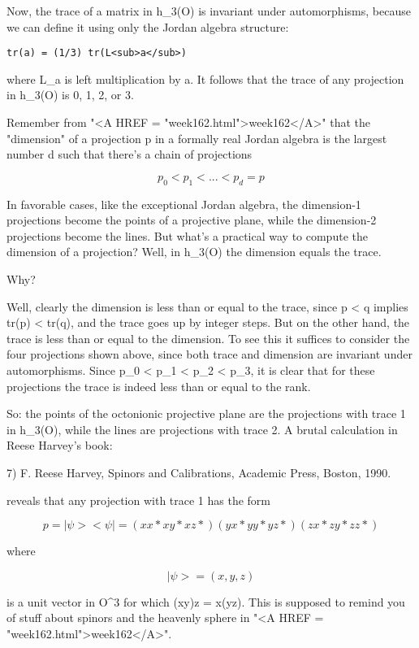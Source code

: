 Now, the trace of a matrix in h_{3}(O) is invariant under
automorphisms, because we can define it using only the Jordan algebra
structure:

\begin{verbatim}
tr(a) = (1/3) tr(L<sub>a</sub>)    
\end{verbatim}
    
where L_{a} is left multiplication by a.  It follows that the trace
of any projection in h_{3}(O) is 0, 1, 2, or 3.  

Remember from "<A HREF = "week162.html">week162</A>" that the
"dimension" of a projection p in a formally real Jordan
algebra is the largest number d such that there's a chain of projections

$$
         p_{0} < p_{1} < ... < p_{d} = p  
$$
    
In favorable cases, like the exceptional Jordan algebra, the dimension-1
projections become the points of a projective plane, while the
dimension-2 projections become the lines.  But what's a practical way to
compute the dimension of a projection?  Well, in h_{3}(O) the
dimension equals the trace.

Why?  

Well, clearly the dimension is less than or equal to the trace, since p
< q implies tr(p) < tr(q), and the trace goes up by integer steps.
But on the other hand, the trace is less than or equal to the dimension.
To see this it suffices to consider the four projections shown above,
since both trace and dimension are invariant under automorphisms.  Since
p_{0} < p_{1} < p_{2} < p_{3}, it is clear that for these projections
the trace is indeed less than or equal to the rank.

So: the points of the octonionic projective plane are the projections
with trace 1 in h_{3}(O), while the lines are projections with
trace 2.  A brutal calculation in Reese Harvey's book:

7) F. Reese Harvey, Spinors and Calibrations, Academic Press, Boston, 1990.

reveals that any projection with trace 1 has the form

$$
p = |\psi > <\psi | = ( xx*   xy*    xz* )
                  ( yx*   yy*    yz* )
                  ( zx*   zy*    zz* )
$$
    
where 

$$
|\psi > = (x,y,z) 
$$
    
is a unit vector in O^{3} for which (xy)z = x(yz).  This is
supposed to remind you of stuff about spinors and the heavenly sphere in
"<A HREF = "week162.html">week162</A>".

